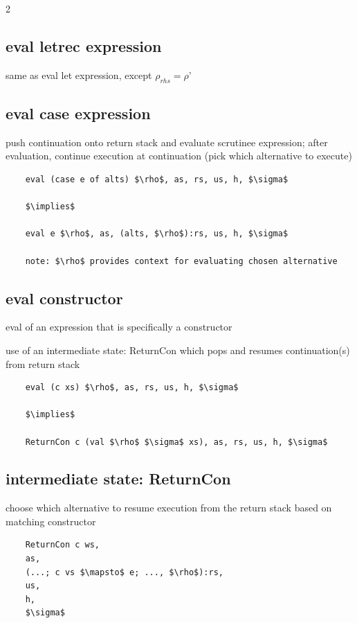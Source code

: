 \documentclass[8pt]{extarticle}
\begin{document}
\begin{multicols*}{2}
  \subsection{eval letrec expression}

  same as eval let expression, except $\rho_{rhs}=\rho$'

  \subsection{eval case expression}

  push continuation onto return stack and evaluate scrutinee expression; after evaluation, continue execution at continuation (pick which alternative to execute)

  \begin{lstlisting}
    eval (case e of alts) $\rho$, as, rs, us, h, $\sigma$

    $\implies$

    eval e $\rho$, as, (alts, $\rho$):rs, us, h, $\sigma$

    note: $\rho$ provides context for evaluating chosen alternative
  \end{lstlisting}

  \subsection{eval constructor}

  eval of an expression that is specifically a constructor

  use of an intermediate state: ReturnCon which pops and resumes continuation(s) from return stack

  \begin{lstlisting}
    eval (c xs) $\rho$, as, rs, us, h, $\sigma$

    $\implies$

    ReturnCon c (val $\rho$ $\sigma$ xs), as, rs, us, h, $\sigma$
  \end{lstlisting}

  \vfill\null
  \columnbreak

  \subsection{intermediate state: ReturnCon}

  choose which alternative to resume execution from the return stack based on matching constructor

  \begin{lstlisting}
    ReturnCon c ws,
    as,
    (...; c vs $\mapsto$ e; ..., $\rho$):rs,
    us,
    h,
    $\sigma$


\end{lstlisting}
\end{multicols*}
\end{document}
